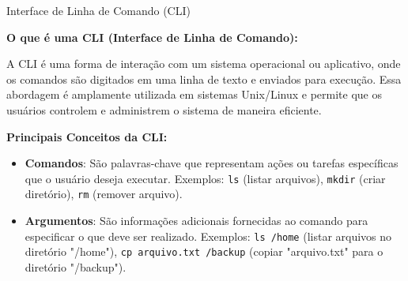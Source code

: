 \documentclass{beamer}
\begin{document}
\begin{frame}{Interface de Linha de Comando (CLI)}

	\textbf{O que é uma CLI (Interface de Linha de Comando):}

	A CLI é uma forma de interação com um sistema operacional ou aplicativo, onde os comandos são digitados em uma linha de texto e enviados para execução.
	Essa abordagem é amplamente utilizada em sistemas Unix/Linux e permite que os usuários controlem e administrem o sistema de maneira eficiente.

	\textbf{Principais Conceitos da CLI:}

	\begin{itemize}
		\item \textbf{Comandos}: São palavras-chave que representam ações ou tarefas específicas que o usuário deseja executar. Exemplos: \texttt{ls} (listar arquivos), \texttt{mkdir} (criar diretório), \texttt{rm} (remover arquivo).
		\item \textbf{Argumentos}: São informações adicionais fornecidas ao comando para especificar o que deve ser realizado. Exemplos: \texttt{ls /home} (listar arquivos no diretório "/home"), \texttt{cp arquivo.txt /backup} (copiar "arquivo.txt" para o diretório "/backup").
	\end{itemize}

\end{frame}
\end{document}
